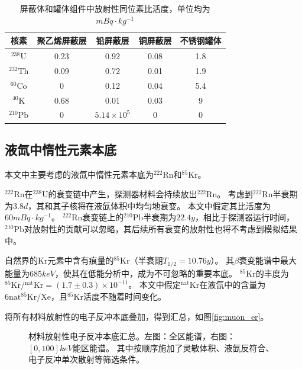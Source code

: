 \begin{table}
  \centering
  \caption{屏蔽体和罐体组件中放射性同位素比活度，单位均为$\si{mBq\cdot kg^{-1}}$}
  \begin{tabular}{ccccc}
    \toprule
    核素 & 聚乙烯屏蔽层 & 铅屏蔽层 & 铜屏蔽层 & 不锈钢罐体 \\
    \midrule
    ${}^{238}\mathrm{U}$ & 0.23 & 0.92 & 0.08 & 1.8 \\
    ${}^{232}\mathrm{Th}$ & 0.09 & 0.72 & 0.01 & 1.9 \\
    ${}^{60}\mathrm{Co}$ & 0 & 0.12 & 0.04 & 5.4 \\
    ${}^{40}\mathrm{K}$ & 0.68 & 0.01 & 0.03 & 9 \\
    ${}^{210}\mathrm{Pb}$ & 0 & $5.14\times10^5$ & 0 & 0 \\
    \bottomrule
  \end{tabular}
  \label{tab:shield_radio}
\end{table}

\subsection{液氙中惰性元素本底}

本文中主要考虑的液氙中惰性元素本底为${}^{222}\mathrm{Rn}$和${}^{85}\mathrm{Kr}$。

${}^{222}\mathrm{Rn}$在${}^{238}\mathrm{U}$的衰变链中产生，探测器材料会持续放出${}^{222}\mathrm{Rn}$。
考虑到${}^{222}\mathrm{Rn}$半衰期为$3.8d$，其和其子核将在液氙体积中均匀地衰变。
本文中假定其比活度为$60\si{mBq\cdot kg^{-1}}$。
${}^{222}\mathrm{Rn}$衰变链上的${}^{210}\mathrm{Pb}$半衰期为$22.4y$，相比于探测器运行时间，
${}^{210}\mathrm{Pb}$对放射性的贡献可以忽略，其后续所有衰变的放射性也将不考虑到模拟结果中。

自然界的$\mathrm{Kr}$元素中含有痕量的${}^{85}\mathrm{Kr}$（半衰期$T_{1/2}=10.76y$）。
其$\beta$衰变能谱中最大能量为$685\si{keV}$，使其在低能分析中，成为不可忽略的重要本底。
${}^{85}\mathrm{Kr}$的丰度为${}^{85}\mathrm{Kr}/{}^\mathrm{nat}\mathrm{Kr}=(1.7\pm0.3)\times 10^{-11}$。
本文中假定${}^\mathrm{nat}\mathrm{Kr}$在液氙中的含量为$6\mathrm{nat}{}^{85}\mathrm{Kr}/\mathrm{Xe}$，且${}^{85}\mathrm{Kr}$活度不随着时间变化。

将所有材料放射性的电子反冲本底叠加，得到汇总，如图\ref{fig:muon_er}。

\begin{figure}
  \centering
  
  \caption{\label{fig:material_er} 材料放射性电子反冲本底汇总。左图：全区能谱，右图：$[0, 100]\si{keV}$能区能谱。
  其中按顺序施加了灵敏体积、液氙反符合、电子反冲单次散射等筛选条件。}
\end{figure}

